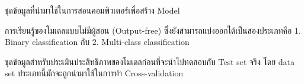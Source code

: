 \begin{description}[style=nextline]
    \item[Training set] ชุดข้อมูลที่นำมาใช้ในการสอนคอมพิวเตอร์เพื่อสร้าง Model

    \item[Unsupervised learning] การเรียนรู้ของโมเดลแบบไม่มีผู้สอน (Output-free)
    ซึ่งยังสามารถแบ่งออกได้เป็นสองประเภทคือ 1. Binary classification กับ 2. Multi-class classification

    \item[Validation set] ชุดข้อมูลสำหรับประเมินประสิทธิภาพของโมเดลก่อนที่จะนำไปทดสอบกับ Test set จริง 
    โดย data set ประเภทนี้มักจะถูกนำมาใช้ในการทำ Cross-validation
\end{description}
